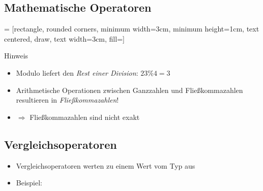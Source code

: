 \subsection{Mathematische Operatoren}
\begin{frame}[fragile]
    \slidehead
    \vspace{-0.2cm}
     = [rectangle, rounded corners, minimum width=3cm, minimum height=1cm, text centered, draw, text width=3cm, fill=]
    \vspace{0.05cm}
    \centering
    \pause
    \vspace{-0.1cm}
    \begin{block}{Hinweis}
        \begin{itemize}
            \item Modulo liefert den \textit{Rest einer Division}: $23 \% 4 = 3$
            \item Arithmetische Operationen zwischen Ganzzahlen und Fließkommazahlen resultieren in \textit{Fließkommazahlen}!  %

                \pause
            \item {} \pause {} $\Rightarrow$ Fließkommazahlen sind nicht exakt
        \end{itemize}
    \end{block}
\end{frame}


\subsection{Vergleichsoperatoren}
\begin{frame}
    \slidehead

    \begin{itemize}
        \item Vergleichsoperatoren werten zu einem Wert vom Typ  aus
        \item Beispiel:
    \end{itemize}
\end{frame}


